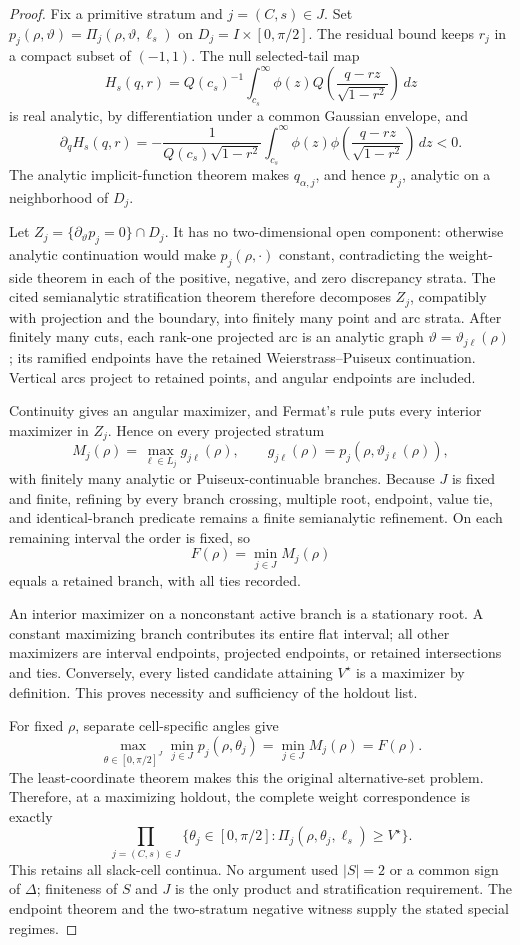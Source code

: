 \documentclass{article}
\begin{document}
\begin{proof}
Fix a primitive stratum and \(j=(C,s)\in J\).  Set \(p_j(\rho,\vartheta)=\Pi_j(\rho,\vartheta,\ell_s)\) on \(D_j=I\times[0,\pi/2]\).  The residual bound keeps \(r_j\) in a compact subset of \((-1,1)\).  The null selected-tail map
\[
H_s(q,r)=Q(c_s)^{-1}\int_{c_s}^{\infty}
\phi(z)Q\!\left(\frac{q-rz}{\sqrt{1-r^2}}\right)\,dz
\]
is real analytic, by differentiation under a common Gaussian envelope, and
\[
\partial_qH_s(q,r)=-\frac{1}{Q(c_s)\sqrt{1-r^2}}
\int_{c_s}^{\infty}\phi(z)
\phi\!\left(\frac{q-rz}{\sqrt{1-r^2}}\right)\,dz<0.
\]
The analytic implicit-function theorem makes \(q_{\alpha,j}\), and hence \(p_j\), analytic on a neighborhood of \(D_j\).

Let \(Z_j=\{\partial_\vartheta p_j=0\}\cap D_j\).  It has no two-dimensional open component: otherwise analytic continuation would make \(p_j(\rho,\cdot)\) constant, contradicting the weight-side theorem in each of the positive, negative, and zero discrepancy strata.  The cited semianalytic stratification theorem therefore decomposes \(Z_j\), compatibly with projection and the boundary, into finitely many point and arc strata.  After finitely many cuts, each rank-one projected arc is an analytic graph \(\vartheta=\vartheta_{j\ell}(\rho)\); its ramified endpoints have the retained Weierstrass--Puiseux continuation.  Vertical arcs project to retained points, and angular endpoints are included.

Continuity gives an angular maximizer, and Fermat's rule puts every interior maximizer in \(Z_j\).  Hence on every projected stratum
\[
M_j(\rho)=\max_{\ell\in L_j}g_{j\ell}(\rho),
\qquad
g_{j\ell}(\rho)=p_j(\rho,\vartheta_{j\ell}(\rho)),
\]
with finitely many analytic or Puiseux-continuable branches.  Because \(J\) is fixed and finite, refining by every branch crossing, multiple root, endpoint, value tie, and identical-branch predicate remains a finite semianalytic refinement.  On each remaining interval the order is fixed, so
\[
F(\rho)=\min_{j\in J}M_j(\rho)
\]
equals a retained branch, with all ties recorded.

An interior maximizer on a nonconstant active branch is a stationary root.  A constant maximizing branch contributes its entire flat interval; all other maximizers are interval endpoints, projected endpoints, or retained intersections and ties.  Conversely, every listed candidate attaining \(V^\star\) is a maximizer by definition.  This proves necessity and sufficiency of the holdout list.

For fixed \(\rho\), separate cell-specific angles give
\[
\max_{\theta\in[0,\pi/2]^J}\min_{j\in J}p_j(\rho,\theta_j)
=\min_{j\in J}M_j(\rho)=F(\rho).
\]
The least-coordinate theorem makes this the original alternative-set problem.  Therefore, at a maximizing holdout, the complete weight correspondence is exactly
\[
\prod_{j=(C,s)\in J}
\{\theta_j\in[0,\pi/2]:
\Pi_j(\rho,\theta_j,\ell_s)\ge V^\star\}.
\]
This retains all slack-cell continua.  No argument used \(|S|=2\) or a common sign of \(\Delta\); finiteness of \(S\) and \(J\) is the only product and stratification requirement.  The endpoint theorem and the two-stratum negative witness supply the stated special regimes.
\end{proof}
\end{document}
